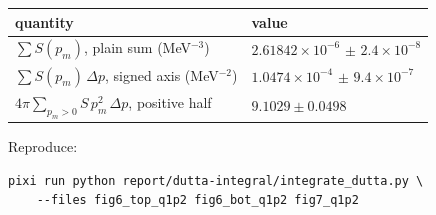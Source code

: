 \documentclass[11pt]{article}
\begin{document}
\begin{center}\small
\begin{tabular}{ll}
\toprule
quantity & value \\
\midrule
$\sum S(p_m)$, plain sum (MeV$^{-3}$) & $2.61842\times10^{-6}$ $\pm$ $2.4\times10^{-8}$ \\
$\sum S(p_m)\,\Delta p$, signed axis (MeV$^{-2}$) & $1.0474\times10^{-4}$ $\pm$ $9.4\times10^{-7}$ \\
$4\pi\sum_{p_m>0} S\,p_m^2\,\Delta p$, positive half & $\mathbf{9.1029 \pm 0.0498}$ \\
\bottomrule
\end{tabular}
\end{center}

Reproduce:
\begin{verbatim}
pixi run python report/dutta-integral/integrate_dutta.py \
    --files fig6_top_q1p2 fig6_bot_q1p2 fig7_q1p2
\end{verbatim}
\end{document}
